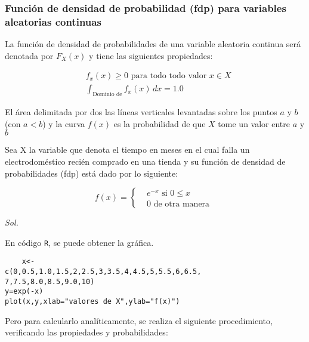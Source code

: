 \subsubsection{Función de densidad de probabilidad (fdp) para variables aleatorias continuas}

La función de densidad de probabilidades de una variable
aleatoria continua será denotada por $F_X(x)$ y tiene las siguientes
propiedades:

\begin{align}
     & f_x(x)\geq 0\text{ para todo todo valor }x\in X \\
     & \int_{\text{Dominio de}} f_x(x)\,dx=1.0
\end{align}

El área delimitada por dos las líneas verticales levantadas sobre
los puntos $a$ y $b$ (con $a < b$) y la curva $f(x)$ es la probabilidad de
que $X$ tome un valor entre $a$ y $b$

\begin{example}
    Sea X la variable que denota el tiempo en meses en el cual
    falla un electrodoméstico recién comprado en una tienda y
    su función de densidad de probabilidades (fdp) está dado
    por lo siguiente:
\end{example}
\begin{equation*}
    f(x)=\begin{cases}
         & e^{-x}\text{ si } 0\leq x \\
         & 0 \text{ de otra manera }
    \end{cases}
\end{equation*}

\textit{ Sol. }

En código \texttt{R}, se puede obtener la gráfica.
\begin{verbatim}
    x<-
c(0,0.5,1.0,1.5,2,2.5,3,3.5,4,4.5,5,5.5,6,6.5,
7,7.5,8.0,8.5,9.0,10)
y=exp(-x)
plot(x,y,xlab="valores de X",ylab="f(x)")
\end{verbatim}

Pero para calcularlo analíticamente, se realiza el siguiente procedimiento, verificando las propiedades y probabilidades:

